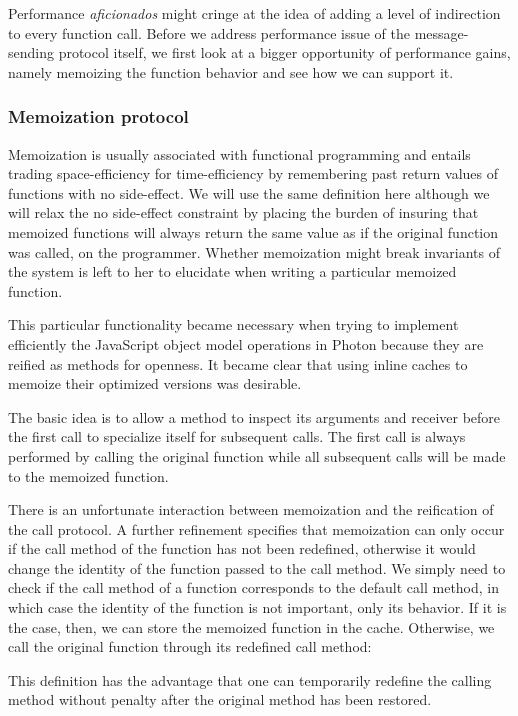 Performance \textit{aficionados} might cringe at the idea of adding a level of
indirection to every function call. Before we address performance issue of the
message-sending protocol itself, we first look at a bigger opportunity of
performance gains, namely memoizing the function behavior and see how we can
support it.

\subsubsection{Memoization protocol}

Memoization is usually associated with functional programming and entails
trading space-efficiency for time-efficiency by remembering past return values
of functions with no side-effect. We will use the same definition here although
we will relax the no side-effect constraint by placing the burden of insuring
that memoized functions will always return the same value as if the original
function was called, on the programmer. Whether memoization might break
invariants of the system is left to her to elucidate when writing a particular
memoized function.

This particular functionality became necessary when trying to implement
efficiently the JavaScript object model operations in Photon because they are
reified as methods for openness. It became clear that using inline caches to
memoize their optimized versions was desirable.

The basic idea is to allow a method to inspect its arguments and receiver
before the first call to specialize itself for subsequent calls. The first call
is always performed by calling the original function while all subsequent calls
will be made to the memoized function.

There is an unfortunate interaction between memoization and the reification of
the call protocol. A further refinement specifies that memoization can only
occur if the call method of the function has not been redefined, otherwise it
would change the identity of the function passed to the call method. We simply
need to check if the call method of a function corresponds to the default call
method, in which case the identity of the function is not important, only its
behavior. If it is the case, then, we can store the memoized function in the
cache. Otherwise, we call the original function through its redefined call
method:


This definition has the advantage that one can temporarily redefine the calling
method without penalty after the original method has been restored.

